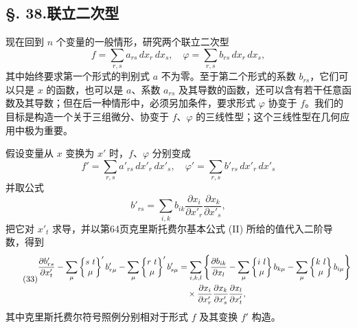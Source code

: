 \subsection*{\S. 38.\quad 联立二次型}
现在回到 $n$ 个变量的一般情形，研究两个联立二次型
\[
f=\sum_{r,s}a_{rs}\,dx_r\,dx_s,\quad \varphi=\sum_{r,s}b_{rs}\,dx_r\,dx_s,
\]
其中始终要求第一个形式的判别式 $a$ 不为零。至于第二个形式的系数 $b_{rs}$，它们可以只是 $x$ 的函数，也可以是 $a$、系数 $a_{rs}$ 及其导数的函数，还可以含有若干任意函数及其导数；但在后一种情形中，必须另加条件，要求形式 $\varphi$ 协变于 $f$。我们的目标是构造一个关于三组微分、协变于 $f$、$\varphi$ 的三线性型；这个三线性型在几何应用中极为重要。

假设变量从 $x$ 变换为 $x'$ 时，$f$、$\varphi$ 分别变成
\[
f'=\sum_{r,s}a'_{rs}\,dx'_r\,dx'_s,\quad \varphi'=\sum_{r,s}b'_{rs}\,dx'_r\,dx'_s
\]
并取公式
\[
b'_{rs}=\sum_{i,k}b_{ik}\frac{\partial x_i}{\partial x'_r}\frac{\partial x_k}{\partial x'_s},
\]
把它对 $x'_t$ 求导，并以第64页克里斯托费尔基本公式 (II) 所给的值代入二阶导数，得到
\begin{equation}\tag{33}
\begin{aligned}
\frac{\partial b'_{rs}}{\partial x'_t}-\sum_\mu\left\{\begin{matrix}s\ t\\ \mu\end{matrix}\right\}'b'_{r\mu}-\sum_\mu\left\{\begin{matrix}r\ t\\ \mu\end{matrix}\right\}'b'_{s\mu}
&=\sum_{i,k,l}\left\{\frac{\partial b_{ik}}{\partial x_l}-\sum_\mu\left\{\begin{matrix}i\ l\\ \mu\end{matrix}\right\}b_{k\mu}-\sum_\mu\left\{\begin{matrix}k\ l\\ \mu\end{matrix}\right\}b_{i\mu}\right\}\\
&\quad\times\frac{\partial x_i}{\partial x'_r}\frac{\partial x_k}{\partial x'_s}\frac{\partial x_l}{\partial x'_t},
\end{aligned}
\end{equation}
其中克里斯托费尔符号照例分别相对于形式 $f$ 及其变换 $f'$ 构造。


